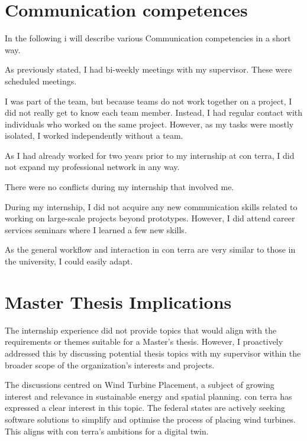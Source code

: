 \documentclass[11pt, titlepage, a4paper]{article}
\begin{document}
\section{Communication competences}
In the following i will describe various Communication competencies in a short way.
\begin{description}[]
    \item[Supervisor Communication:] As previously stated, I had bi-weekly meetings with my supervisor. These were scheduled meetings.
    \item[Teamwork:] I was part of the team, but because teams do not work together on a project, I did not really get to know each team member. Instead, I had regular contact with individuals who worked on the same project. However, as my tasks were mostly isolated, I worked independently without a team.
    \item[Professional Network:] As I had already worked for two years prior to my internship at con terra, I did not expand my professional network in any way.
    \item[Conflicts:] There were no conflicts during my internship that involved me.
    \item[Communication Skills:]  During my internship, I did not acquire any new communication skills related to working on large-scale projects beyond prototypes. However, I did attend career services seminars where I learned a few new skills.
    \item[Applied Communication Skills:]  As the general workflow and interaction in con terra are very similar to those in the university, I could easily adapt.
\end{description}

\section{Master Thesis Implications}
The internship experience did not provide topics that would align with the requirements or themes suitable for a Master's thesis. However, I proactively addressed this by discussing potential thesis topics with my supervisor within the broader scope of the organization's interests and projects.

The discussions centred on Wind Turbine Placement, a subject of growing interest and relevance in sustainable energy and spatial planning. con terra has expressed a clear interest in this topic. The federal states are actively seeking software solutions to simplify and optimise the process of placing wind turbines. This aligns with con terra's ambitions for a digital twin.
\end{document}
